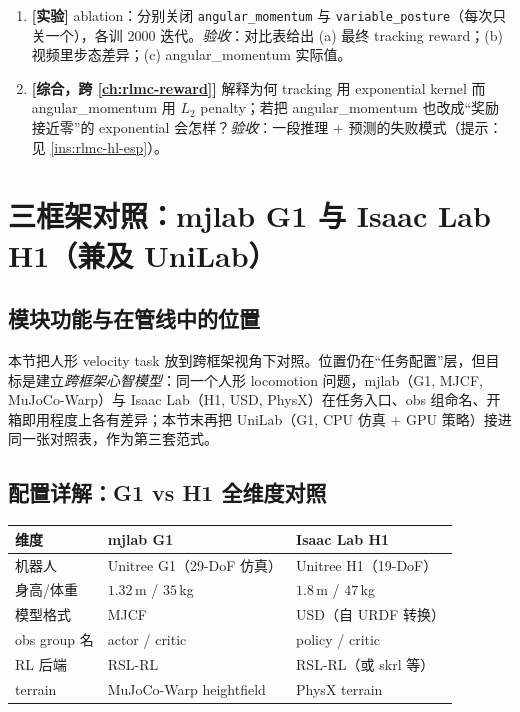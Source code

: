 \begin{practice}[本节动手]
\begin{enumerate}
  \item \textbf{[实验]} ablation：分别关闭 \texttt{angular\_momentum} 与 \texttt{variable\_posture}（每次只关一个），各训 $2000$ 迭代。\emph{验收}：对比表给出 (a) 最终 tracking reward；(b) 视频里步态差异；(c) angular\_momentum 实际值。
  \item \textbf{[综合，跨 \cref{ch:rlmc-reward}]} 解释为何 tracking 用 exponential kernel 而 angular\_momentum 用 $L_2$ penalty；若把 angular\_momentum 也改成“奖励接近零”的 exponential 会怎样？\emph{验收}：一段推理 $+$ 预测的失败模式（提示：见 \cref{ins:rlmc-hl-esp}）。
\end{enumerate}
\end{practice}

\section{三框架对照：mjlab G1 与 Isaac Lab H1（兼及 UniLab）}\label{sec:rlmc-hl-isaac}

\subsection{模块功能与在管线中的位置}
本节把人形 velocity task 放到跨框架视角下对照。位置仍在“任务配置”层，但目标是建立\emph{跨框架心智模型}：同一个人形 locomotion 问题，mjlab（G1, MJCF, MuJoCo-Warp）与 Isaac Lab（H1, USD, PhysX）在任务入口、obs 组命名、开箱即用程度上各有差异；本节末再把 UniLab（G1, CPU 仿真 $+$ GPU 策略）接进同一张对照表，作为第三套范式。

\subsection{配置详解：G1 vs H1 全维度对照}

\begin{center}
\small
\begin{tabular}{lll}
\hline
维度 & mjlab G1 & Isaac Lab H1 \\
\hline
机器人 & Unitree G1（29-DoF 仿真） & Unitree H1（19-DoF） \\
身高/体重 & $1.32$\,m / $35$\,kg & $1.8$\,m / $47$\,kg \\
模型格式 & MJCF & USD（自 URDF 转换） \\
obs group 名 & actor / critic & policy / critic \\
RL 后端 & RSL-RL & RSL-RL（或 skrl 等） \\
terrain & MuJoCo-Warp heightfield & PhysX terrain \\
\hline
\end{tabular}
\end{center}

